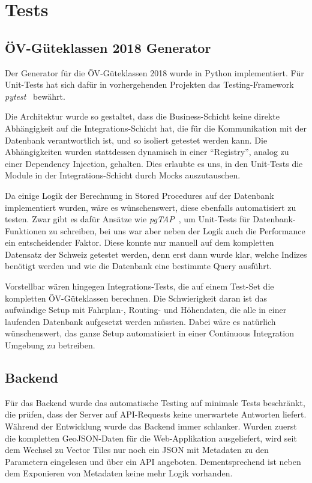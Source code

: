 \section{Tests}
\label{Tests}

\subsection{ÖV-Güteklassen 2018 Generator}
\label{Tests:ÖV-Güteklassen 2018 Generator}

Der Generator für die \acs{ÖV}-Güteklassen 2018 wurde in Python implementiert.
Für Unit-Tests hat sich dafür in vorhergehenden Projekten das Testing-Framework \emph{pytest}~\cite{pytest} bewährt.

Die Architektur wurde so gestaltet, dass die Business-Schicht keine direkte Abhängigkeit auf die Integrations-Schicht hat, die für die Kommunikation mit der Datenbank verantwortlich ist, und so isoliert getestet werden kann.
Die Abhängigkeiten wurden stattdessen dynamisch in einer "`Registry"', analog zu einer Dependency Injection, gehalten.
Dies erlaubte es uns, in den Unit-Tests die Module in der Integrations-Schicht durch Mocks auszutauschen.

Da einige Logik der Berechnung in Stored Procedures auf der Datenbank implementiert wurden, wäre es wünschenswert, diese ebenfalls automatisiert zu testen.
Zwar gibt es dafür Ansätze wie \emph{pgTAP}~\cite{pgTAP}, um Unit-Tests für Datenbank-Funktionen zu schreiben, bei uns war aber neben der Logik auch die Performance ein entscheidender Faktor.
Diese konnte nur manuell auf dem kompletten Datensatz der Schweiz getestet werden, denn erst dann wurde klar, welche Indizes benötigt werden und wie die Datenbank eine bestimmte Query ausführt.

Vorstellbar wären hingegen Integrations-Tests, die auf einem Test-Set die kompletten \acs{ÖV}-Güteklassen berechnen.
Die Schwierigkeit daran ist das aufwändige Setup mit Fahrplan-, Routing- und Höhendaten, die alle in einer laufenden Datenbank aufgesetzt werden müssten.
Dabei wäre es natürlich wünschenswert, das ganze Setup automatisiert in einer Continuous Integration Umgebung zu betreiben.

\subsection{Backend}
\label{Tests:Backend}

Für das Backend wurde das automatische Testing auf minimale Tests beschränkt, die prüfen, dass der Server auf API-Requests keine unerwartete Antworten liefert.
Während der Entwicklung wurde das Backend immer schlanker.
Wurden zuerst die kompletten GeoJSON-Daten für die Web-Applikation ausgeliefert, wird seit dem Wechsel zu Vector Tiles nur noch ein JSON mit Metadaten zu den Parametern eingelesen und über ein API angeboten.
Dementsprechend ist neben dem Exponieren von Metadaten keine mehr Logik vorhanden.

